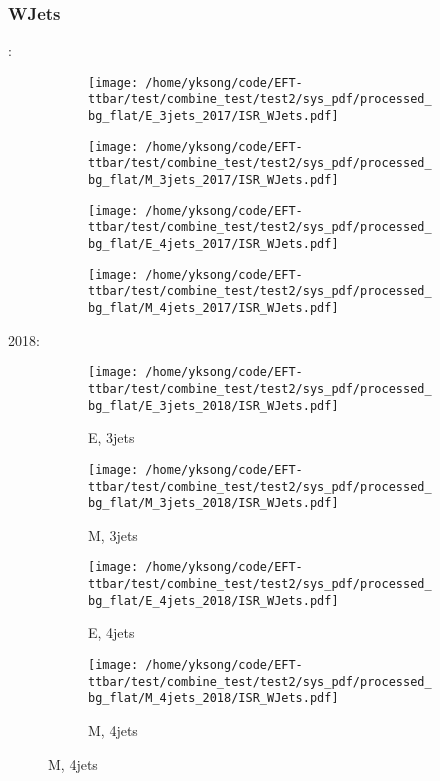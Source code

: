\documentclass{beamer}
\begin{document}
\begin{frame}
\frametitle{WJets}
\fontsize{5}{1}:
\begin{figure}
\centering
\begin{subfigure}[b]{0.24\textwidth}
\texttt{[image: /home/yksong/code/EFT-ttbar/test/combine\_test/test2/sys\_pdf/processed\_bg\_flat/E\_3jets\_2017/ISR\_WJets.pdf]}
\end{subfigure}
\begin{subfigure}[b]{0.24\textwidth}
\texttt{[image: /home/yksong/code/EFT-ttbar/test/combine\_test/test2/sys\_pdf/processed\_bg\_flat/M\_3jets\_2017/ISR\_WJets.pdf]}
\end{subfigure}
\begin{subfigure}[b]{0.24\textwidth}
\texttt{[image: /home/yksong/code/EFT-ttbar/test/combine\_test/test2/sys\_pdf/processed\_bg\_flat/E\_4jets\_2017/ISR\_WJets.pdf]}
\end{subfigure}
\begin{subfigure}[b]{0.24\textwidth}
\texttt{[image: /home/yksong/code/EFT-ttbar/test/combine\_test/test2/sys\_pdf/processed\_bg\_flat/M\_4jets\_2017/ISR\_WJets.pdf]}
\end{subfigure}
\end{figure}
2018:
\begin{figure}
\centering
\begin{subfigure}[b]{0.24\textwidth}
\texttt{[image: /home/yksong/code/EFT-ttbar/test/combine\_test/test2/sys\_pdf/processed\_bg\_flat/E\_3jets\_2018/ISR\_WJets.pdf]}
\captionsetup{font=tiny}
\caption{E, 3jets}
\end{subfigure}
\begin{subfigure}[b]{0.24\textwidth}
\texttt{[image: /home/yksong/code/EFT-ttbar/test/combine\_test/test2/sys\_pdf/processed\_bg\_flat/M\_3jets\_2018/ISR\_WJets.pdf]}
\captionsetup{font=tiny}
\caption{M, 3jets}
\end{subfigure}
\begin{subfigure}[b]{0.24\textwidth}
\texttt{[image: /home/yksong/code/EFT-ttbar/test/combine\_test/test2/sys\_pdf/processed\_bg\_flat/E\_4jets\_2018/ISR\_WJets.pdf]}
\captionsetup{font=tiny}
\caption{E, 4jets}
\end{subfigure}
\begin{subfigure}[b]{0.24\textwidth}
\texttt{[image: /home/yksong/code/EFT-ttbar/test/combine\_test/test2/sys\_pdf/processed\_bg\_flat/M\_4jets\_2018/ISR\_WJets.pdf]}
\captionsetup{font=tiny}
\caption{M, 4jets}
\end{subfigure}
\end{figure}
\end{frame}
\end{document}
